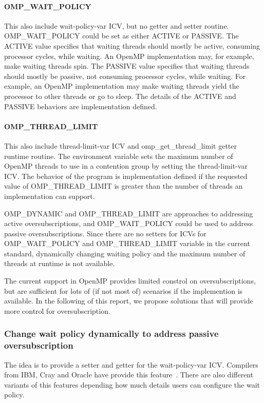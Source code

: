 \paragraph{OMP\_WAIT\_POLICY} %
This also include wait-policy-var ICV, but no getter and setter routine. 
OMP\_WAIT\_POLICY could be set as either ACTIVE or PASSIVE. 
The ACTIVE value specifies that waiting threads should mostly be active, consuming processor
 cycles, while waiting. An OpenMP implementation may, for example, make waiting threads spin.
 The PASSIVE value specifies that waiting threads should mostly be passive, not consuming
 processor cycles, while waiting. For example, an OpenMP implementation may make waiting
 threads yield the processor to other threads or go to sleep.
 The details of the ACTIVE and PASSIVE behaviors are implementation defined.
 
 \paragraph{OMP\_THREAD\_LIMIT}
 This also include thread-limit-var ICV and omp\_get\_thread\_limit getter runtime routine.
 The environment variable sets the maximum number of OpenMP threads to use in a contention group by setting the thread-limit-var ICV.
The behavior of the program is implementation defined if the requested value of OMP\_THREAD\_LIMIT is greater than the number of threads an implementation can support. 

OMP\_DYNAMIC and OMP\_THREAD\_LIMIT are approaches to 
addressing active oversubscriptions, and OMP\_WAIT\_POLICY could be used to address 
passive oversubscriptions. 
Since there are no setters for ICVs for OMP\_WAIT\_POLICY 
and OMP\_THREAD\_LIMIT variable in the current standard, 
dynamically changing waiting policy and the maximum number of 
threads at runtime is not available.

The current support in OpenMP provides limited constrol on oversubscriptions, but are sufficient 
for lots of (if not most of) scenarios if the implemention is available. In the following of this
report, we propose solutions that will provide more
control for oversubscription.
\subsubsection{Change wait policy dynamically to address passive oversubscription}
The idea is to provide a setter and getter for the wait-policy-var
ICV. Compilers from IBM, Cray and Oracle have provide this feature~\cite{ibmwait, craywait, oraclewait}.
There are also different variants of this features depending how much details users can configure
the wait policy.
